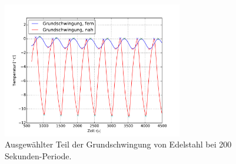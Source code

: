 \begin{figure}[h!]
	\centering
	\includegraphics[width=0.7\textwidth]{Bilder/M3_Edelstahl_norm.pdf}
	\caption{Ausgewählter Teil der Grundschwingung von Edelstahl bei 200 Sekunden-Periode.}
	\label{fig:M3EdelstahlNormkurve}
\end{figure}
